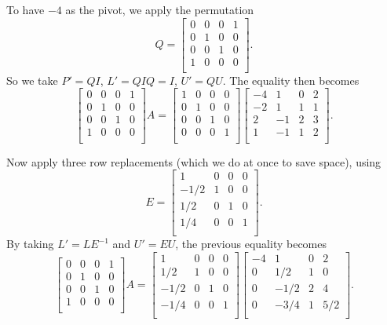 \documentclass[11pt]{article}
\newcommand{\1}{\mathbf{1}}
\newcommand{\0}{\mathbf{0}}
\begin{document}
To have $-4$ as the pivot, we apply the permutation
\[
Q = 
\begin{bmatrix}
  0	&  0	&  0	&  1 \\
  0	&  1	&  0	&  0 \\
  0	&  0	&  1	&  0 \\
  1	&  0	&  0	&  0 \\
\end{bmatrix}
.
\]
So we take $P' = Q I$, $L' = Q I Q = I$, $U' = QU$.
The equality then becomes
\[
\begin{bmatrix}
  0	&  0	&  0	&  1 \\
  0	&  1	&  0	&  0 \\
  0	&  0	&  1	&  0 \\
  1	&  0	&  0	&  0 \\
\end{bmatrix}
A
=
\begin{bmatrix}
  1	&  0	&  0	&  0 \\
  0	&  1	&  0	&  0 \\
  0	&  0	&  1	&  0 \\
  0	&  0	&  0	&  1 \\
\end{bmatrix}
\begin{bmatrix}
 -4	&  1	&  0	&  2 \\
 -2	&  1	&  1	&  1 \\
  2	& -1	&  2	&  3 \\
  1	& -1	&  1	&  2 \\
\end{bmatrix}
.
\]

Now apply three row replacements (which we do at once to save space), using
\[
E =
\begin{bmatrix}
  1	&  0	&  0	&  0 \\
 -1/2	&  1	&  0	&  0 \\
  1/2	&  0	&  1	&  0 \\
  1/4	&  0	&  0	&  1 \\
\end{bmatrix}
.
\]
By taking $L' = LE^{-1}$ and $U'=EU$, the previous equality becomes
\[
\begin{bmatrix}
  0	&  0	&  0	&  1 \\
  0	&  1	&  0	&  0 \\
  0	&  0	&  1	&  0 \\
  1	&  0	&  0	&  0 \\
\end{bmatrix}
A
=
\begin{bmatrix}
  1	&  0	&  0	&  0 \\
  1/2	&  1	&  0	&  0 \\
 -1/2	&  0	&  1	&  0 \\
 -1/4	&  0	&  0	&  1 \\
\end{bmatrix}
\begin{bmatrix}
 -4	&  1	&  0	&  2 \\
  0	&  1/2	&  1	&  0 \\
  0	& -1/2	&  2	&  4 \\
  0	& -3/4	&  1	&  5/2 \\
\end{bmatrix}
.
\]
\end{document}
